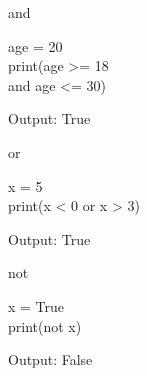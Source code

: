 \noindent
\begin{minipage}[t]{0.32\linewidth}

\begin{sideexamplebox}{\textenglish{\ttfamily and}}

\begin{sidecodebox}
\begin{english}
\ttfamily
age = 20\\
print(age >= 18\\
\hspace*{3mm}and age <= 30)
\end{english}
\end{sidecodebox}

Output:
\textenglish{\ttfamily True}

\end{sideexamplebox}

\end{minipage}
\hfill
\begin{minipage}[t]{0.32\linewidth}

\begin{sideexamplebox}{\textenglish{\ttfamily or}}

\begin{sidecodebox}
\begin{english}
\ttfamily
x = 5\\
print(x < 0 or x > 3)
\end{english}
\end{sidecodebox}

Output:
\textenglish{\ttfamily True}

\end{sideexamplebox}

\end{minipage}
\hfill
\begin{minipage}[t]{0.32\linewidth}

\begin{sideexamplebox}{\textenglish{\ttfamily not}}

\begin{sidecodebox}
\begin{english}
\ttfamily
x = True\\
print(not x)
\end{english}
\end{sidecodebox}

Output:
\textenglish{\ttfamily False}

\end{sideexamplebox}

\end{minipage}

